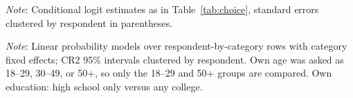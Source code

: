 \documentclass[11pt]{article}
\newcommand{\TableStyle}{\small\setlength{\tabcolsep}{5pt}\renewcommand{\arraystretch}{1.05}}
\begin{document}
\begin{table}[H]
\centering\TableStyle
\caption{Weight on diagnosticity ($\theta$) under alternative benchmarks and samples.}
\label{tab:choice-sens}

\begin{minipage}{\linewidth}\footnotesize\vspace{4pt}
\emph{Note}: Conditional logit estimates as in Table~\ref{tab:choice}, standard errors clustered by respondent in parentheses.
\end{minipage}
\end{table}

\begin{table}[H]
\centering\TableStyle
\caption{Projection: difference in the probability of guessing a category between respondents who belong to it and those who do not.}
\label{tab:projection}

\begin{minipage}{\linewidth}\footnotesize\vspace{4pt}
\emph{Note}: Linear probability models over respondent-by-category rows with category fixed effects; CR2 95\% intervals clustered by respondent. Own age was asked as 18--29, 30--49, or 50+, so only the 18--29 and 50+ groups are compared. Own education: high school only versus any college.
\end{minipage}
\end{table}
\end{document}
